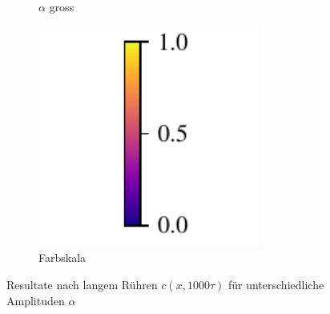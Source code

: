 \begin{frame}
\begin{figure}
\begin{subfigure}{0.32\textwidth}
\caption{$\alpha$ gross}
\end{subfigure}
%
\begin{subfigure}{0.32\textwidth}
\centering
\includegraphics[width=0.8\textwidth]{images/colorbar}
\caption{Farbskala}
\end{subfigure}
\caption{Resultate nach langem Rühren $c(x,1000\tau)$ für unterschiedliche Amplituden $\alpha$ }
\end{figure}

\end{frame}
